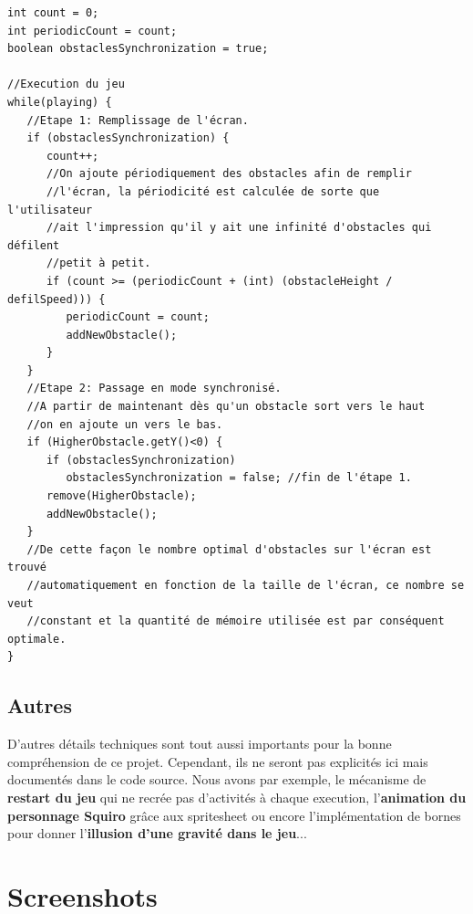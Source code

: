 \documentclass[12pt,a4paper,abstract=on,parskip=full]{scrartcl}
\begin{document}
\begin{verbatim}
int count = 0;
int periodicCount = count;
boolean obstaclesSynchronization = true;

//Execution du jeu
while(playing) {
   //Etape 1: Remplissage de l'écran. 
   if (obstaclesSynchronization) {
      count++;
      //On ajoute périodiquement des obstacles afin de remplir
      //l'écran, la périodicité est calculée de sorte que l'utilisateur
      //ait l'impression qu'il y ait une infinité d'obstacles qui défilent
      //petit à petit.
      if (count >= (periodicCount + (int) (obstacleHeight / defilSpeed))) {
         periodicCount = count;
         addNewObstacle();
      }
   }      
   //Etape 2: Passage en mode synchronisé.
   //A partir de maintenant dès qu'un obstacle sort vers le haut
   //on en ajoute un vers le bas.
   if (HigherObstacle.getY()<0) {
      if (obstaclesSynchronization)
         obstaclesSynchronization = false; //fin de l'étape 1.
      remove(HigherObstacle);
      addNewObstacle();
   }
   //De cette façon le nombre optimal d'obstacles sur l'écran est trouvé 
   //automatiquement en fonction de la taille de l'écran, ce nombre se veut
   //constant et la quantité de mémoire utilisée est par conséquent optimale.
}
\end{verbatim}

\subsection{Autres}

D'autres détails techniques sont tout aussi importants pour la bonne compréhension de ce projet. Cependant, ils ne seront pas explicités ici mais documentés dans le code source.
Nous avons par exemple, le mécanisme de \textbf{restart du jeu} qui ne recrée pas d'activités à chaque execution, l'\textbf{animation du personnage Squiro} grâce aux spritesheet ou encore l'implémentation de bornes pour donner l'\textbf{illusion d'une gravité dans le jeu}...

\section{Screenshots}
\end{document}
